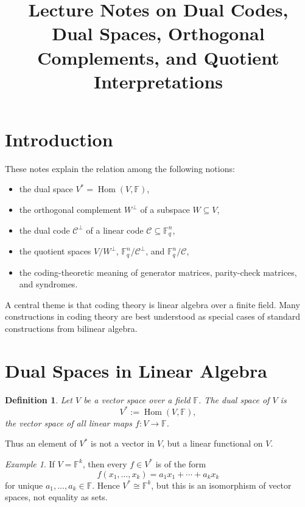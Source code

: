 \documentclass[11pt]{article}
\title{Lecture Notes on Dual Codes, Dual Spaces, Orthogonal Complements, and Quotient Interpretations}
\author{}
\date{}
\newtheorem{definition}{Definition}
\theoremstyle{remark}
\newtheorem{example}{Example}
\newcommand{\F}{\mathbb{F}}
\newcommand{\C}{\mathcal{C}}
\newcommand{\Hom}{\operatorname{Hom}}
\begin{document}
	
	\maketitle
	
	\tableofcontents
	
	\section{Introduction}
	
	These notes explain the relation among the following notions:
	
	\begin{itemize}[leftmargin=2em]
		\item the dual space \(V^* = \Hom(V,\F)\),
		\item the orthogonal complement \(W^\perp\) of a subspace \(W \subseteq V\),
		\item the dual code \(\C^\perp\) of a linear code \(\C \subseteq \F_q^n\),
		\item the quotient spaces \(V/W^\perp\), \(\F_q^n/\C^\perp\), and \(\F_q^n/\C\),
		\item the coding-theoretic meaning of generator matrices, parity-check matrices, and syndromes.
	\end{itemize}
	
	A central theme is that coding theory is linear algebra over a finite field. Many constructions in coding theory are best understood as special cases of standard constructions from bilinear algebra.
	
	\section{Dual Spaces in Linear Algebra}
	
	\begin{definition}
		Let \(V\) be a vector space over a field \(\F\). The \emph{dual space} of \(V\) is
		\[
		V^* := \Hom(V,\F),
		\]
		the vector space of all linear maps \(f : V \to \F\).
	\end{definition}
	
	Thus an element of \(V^*\) is not a vector in \(V\), but a linear functional on \(V\).
	
	\begin{example}
		If \(V=\F^k\), then every \(f\in V^*\) is of the form
		\[
		f(x_1,\dots,x_k)=a_1x_1+\cdots+a_kx_k
		\]
		for unique \(a_1,\dots,a_k\in\F\). Hence \(V^*\cong \F^k\), but this is an isomorphism of vector spaces, not equality as sets.
	\end{example}
	
\end{document}
